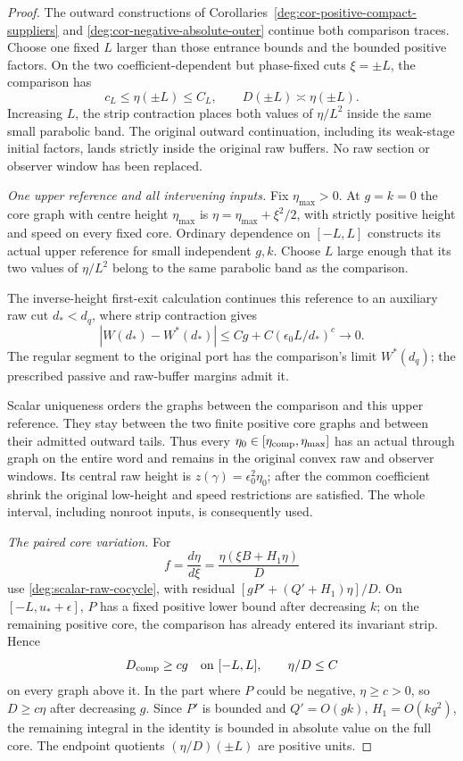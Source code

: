 \begin{proof}
The outward constructions of
Corollaries~\ref{deg:cor-positive-compact-suppliers} and
\ref{deg:cor-negative-absolute-outer} continue both comparison
traces. Choose one fixed \(L\) larger than those entrance bounds
and the bounded positive factors. On the two coefficient-dependent
but phase-fixed cuts \(\xi=\pm L\), the comparison has
\[
 c_L\le\eta(\pm L)\le C_L,
 \qquad D(\pm L)\asymp\eta(\pm L).
\]
Increasing \(L\), the strip contraction places both values of
\(\eta/L^2\) inside the same small parabolic band. The original
outward continuation, including its weak-stage initial factors,
lands strictly inside the original raw buffers. No raw section or
observer window has been replaced.

\smallskip
\noindent\emph{One upper reference and all intervening inputs.}
Fix \(\eta_{\max}>0\). At \(g=k=0\) the core graph with centre
height \(\eta_{\max}\) is
\(\eta=\eta_{\max}+\xi^2/2\), with strictly positive height and
speed on every fixed core. Ordinary dependence on \([-L,L]\)
constructs its actual upper reference for small independent \(g,k\).
Choose \(L\) large enough that its two values of \(\eta/L^2\)
belong to the same parabolic band as the comparison.

The inverse-height first-exit calculation continues this reference
to an auxiliary raw cut \(d_*<d_q\), where strip contraction gives
\[
 |W(d_*)-W^*(d_*)|\le Cg+C(\epsilon_0L/d_*)^c\longrightarrow0.
\]
The regular segment to the original port has the comparison's limit
\(W^*(d_q)\); the prescribed passive and raw-buffer margins admit it.

Scalar uniqueness orders the graphs between the comparison and
this upper reference. They stay between the two finite positive
core graphs and between their admitted outward tails. Thus every
\(\eta_0\in[\eta_{\rm comp},\eta_{\max}]\) has an actual through
graph on the entire word and remains in the original convex raw
and observer windows. Its central raw height is
\(z(\gamma)=\epsilon_0^2\eta_0\); after the common coefficient
shrink the original low-height and speed restrictions are satisfied.
The whole interval, including nonroot inputs, is consequently used.

\smallskip
\noindent\emph{The paired core variation.}
For
\[
 f=\frac{d\eta}{d\xi}
   =\frac{\eta(\xi B+H_1\eta)}D
\]
use \eqref{deg:scalar-raw-cocycle}, with residual
\([gP'+(Q'+H_1)\eta]/D\).
On \([-L,u_*+\epsilon]\), \(P\) has a fixed positive lower
bound after decreasing \(k\); on the remaining positive core,
the comparison has already entered its invariant strip. Hence
\[
 D_{\rm comp}\ge c g\quad\text{on }[-L,L],\qquad
 \eta/D\le C
\]
on every graph above it. In the part where \(P\) could be negative,
\(\eta\ge c>0\), so \(D\ge c\eta\) after decreasing \(g\).
Since \(P'\) is bounded and
\(Q'=O(gk)\), \(H_1=O(kg^2)\), the remaining integral in the
identity is bounded in absolute value on the full core. The endpoint
quotients \((\eta/D)(\pm L)\) are positive units.


\end{proof}

